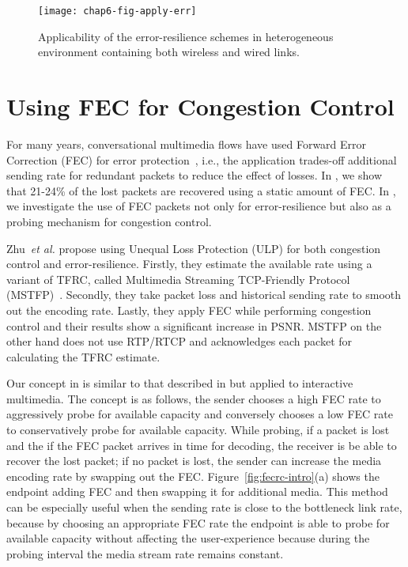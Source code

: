 \begin{figure}
\centerline {
\texttt{[image: chap6-fig-apply-err]}
}
\caption{Applicability of the error-resilience schemes in heterogeneous
environment containing both wireless and wired links.}
\label{fig:apply_err}
\end{figure}


\section{Using FEC for Congestion Control}

For many years, conversational multimedia flows have used Forward Error
Correction (FEC) for error protection~\cite{855913, 664283}, i.e., the
application trades-off additional sending rate for redundant packets to reduce
the effect of losses. In , we show that 21-24\% of the lost
packets are recovered using a static amount of FEC. In , we
investigate the use of FEC packets not only for error-resilience but also as a
probing mechanism for congestion control.

Zhu~\textit{et al.}\cite{Zhu:2001tu,springerlink:1022865704606} propose using
Unequal Loss Protection (ULP) for both congestion control and
error-resilience. Firstly, they estimate the available rate using a variant of
TFRC, called Multimedia Streaming TCP-Friendly Protocol (MSTFP)~\cite{871542}.
Secondly, they take packet loss and historical sending rate to smooth out the
encoding rate. Lastly, they apply FEC while performing congestion control and
their results show a significant increase in PSNR. MSTFP on the other hand
does not use RTP/RTCP and acknowledges each packet for calculating the TFRC
estimate.

Our concept in  is similar to that described in
\cite{Zhu:2001tu} but applied to interactive multimedia. The concept is as
follows, the sender chooses a high FEC rate to aggressively probe for
available capacity and conversely chooses a low FEC rate to conservatively
probe for available capacity. While probing, if a packet is lost and the if
the FEC packet arrives in time for decoding, the receiver is be able to
recover the lost packet; if no packet is lost, the sender can increase the
media encoding rate by swapping out the FEC. Figure~\ref{fig:fecrc-intro}(a)
shows the endpoint adding FEC and then swapping it for additional media. This
method can be especially useful when the sending rate is close to the
bottleneck link rate, because by choosing an appropriate FEC rate the endpoint
is able to probe for available capacity without affecting the user-experience
because during the probing interval the media stream rate remains constant.


